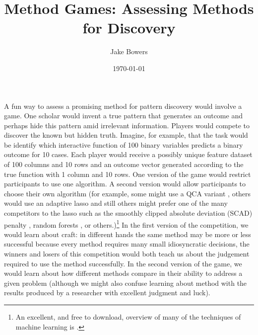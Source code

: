 \documentclass[12pt]{article}
\title{Method Games: Assessing Methods for Discovery}
\author{Jake Bowers}
\date{\today}
\begin{document}
\maketitle

A fun way to assess a promising method for pattern discovery would involve a
game.  One scholar would invent a true pattern that generates an outcome and
perhaps hide this pattern amid irrelevant information.  Players would compete
to discover the known but hidden truth.  Imagine, for example, that the task
would be identify which interactive function of 100 binary variables predicts
a binary outcome for 10 cases. Each player would receive a possibly unique
feature dataset of 100 columns and 10 rows and an outcome vector generated
according to the true function with 1 column and 10 rows. One version of the
game would restrict participants to use one algorithm. A second version would
allow participants to choose their own algorithm (for example, some might use
a QCA variant \citep{rihoux2008configurational}, others would use an adaptive
lasso \citep{zou2006adaptive} and still others might prefer one of the many
competitors to the lasso such as the smoothly clipped absolute deviation
(SCAD) penalty \citep{fan2001variable}, random forests
\citep{breiman2001random}, or others.)\footnote{An excellent, and free to
	download, overview of many of the techniques of machine learning is
	\citet{hastie2005elements}.} In the first version of the competition, we
would learn about craft: in different hands the same method may be more or
less successful because every method requires many small idiosyncratic
decisions, the winners and losers of this competition would both teach us
about the judgement required to use the method successfully.  In the second
version of the game, we would learn about how different methods compare in
their ability to address a given problem (although we might also confuse
learning about method with the results produced by a researcher with excellent
judgment and luck).
\end{document}
